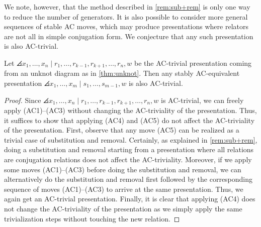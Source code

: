\medskip
We note, however, that the method described in \cref{rem:sub+rem} is only one way to reduce the number of generators. It is also possible to consider more general sequences of stable AC moves, which may produce presentations where relators are not all in simple conjugation form. We conjecture that any such presentation is also AC-trivial.
\begin{theorem}
    \label{conj:unknot}
    Let $\angles{ x_1,\ldots, x_n \mid r_1,\ldots, r_{k-1},r_{k+1},\ldots, r_n, w}$ be the AC-trivial presentation coming from an unknot diagram as in \cref{thm:unknot}. Then any stably AC-equivalent presentation $\angles{ x_1,\ldots, x_m \mid s_1,\ldots, s_{m-1}, w}$ is also AC-trivial.
    \end{theorem}
\begin{proof}
    Since $\angles{ x_1,\ldots, x_n \mid r_1,\ldots, r_{k-1},r_{k+1},\ldots, r_n, w}$ is AC-trivial, we can freely apply (AC1)–(AC3) without changing the AC-triviality of the presentation. Thus, it suffices to show that applying (AC4) and (AC5) do not affect the AC-triviality of the presentation. First, observe that any move (AC5) can be realized as a trivial case of substitution and removal. Certainly, as explained in \cref{rem:sub+rem}, doing a substitution and removal starting from a presentation where all relations are conjugation relations does not affect the AC-triviality. Moreover, if we apply some moves (AC1)–(AC3) before doing the substitution and removal, we can alternatively do the substitution and removal first followed by the corresponding sequence of moves (AC1)–(AC3) to arrive at the same presentation. Thus, we again get an AC-trivial presentation. Finally, it is clear that applying (AC4) does not change the AC-triviality of the presentation as we simply apply the same trivialization steps without touching the new relation.  
\end{proof}
